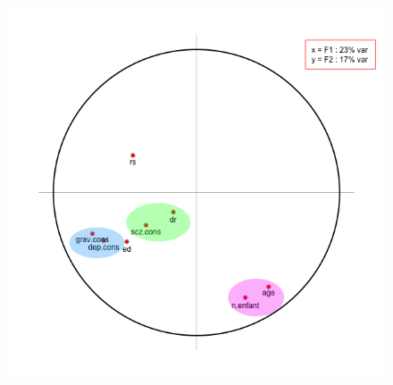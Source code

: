 \begin{figure}[H]\begin{center}\includegraphics[scale=0.5]{ilu/ACPgroupe.png}\end{center}\end{figure}

